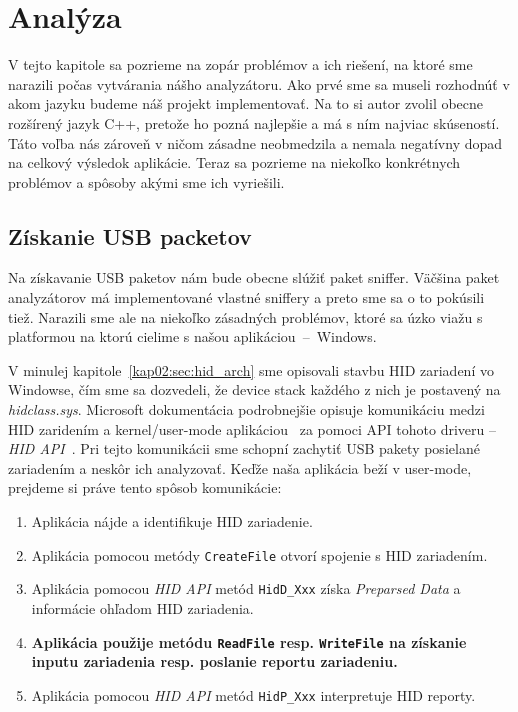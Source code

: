 \chapter{Analýza}
V tejto kapitole sa pozrieme na zopár problémov a ich riešení, na ktoré sme narazili počas vytvárania nášho analyzátoru.
Ako prvé sme sa museli rozhodnúť v akom jazyku budeme náš projekt implementovať. Na to si autor zvolil obecne rozšírený jazyk C++, pretože ho pozná najlepšie a má s ním najviac skúseností. Táto voľba nás zároveň v ničom zásadne neobmedzila a nemala negatívny dopad na celkový výsledok aplikácie. Teraz sa pozrieme na niekoľko konkrétnych problémov a spôsoby akými sme ich vyriešili.

\section{Získanie USB packetov}
Na získavanie USB paketov nám bude obecne slúžiť paket sniffer. Väčšina paket analyzátorov má implementované vlastné sniffery a preto sme sa o to pokúsili tiež. Narazili sme ale na niekoľko zásadných problémov, ktoré sa úzko viažu s platformou na ktorú cielime s našou aplikáciou~--~Windows.

V minulej kapitole~\ref{kap02:sec:hid_arch} sme opisovali stavbu HID zariadení vo Windowse, čím sme sa dozvedeli, že device stack každého z nich je postavený na \textit{hidclass.sys}. Microsoft dokumentácia podrobnejšie opisuje komunikáciu medzi HID zaridením a kernel/user-mode aplikáciou~\cite{hid_opening_collections} za pomoci API tohoto driveru -- \textit{HID API}~\cite{hid_api}.
Pri tejto komunikácii sme schopní zachytiť USB pakety posielané zariadením a neskôr ich analyzovať. Keďže naša aplikácia beží v user-mode, prejdeme si práve tento spôsob komunikácie:
\begin{enumerate}
\item Aplikácia nájde a identifikuje HID zariadenie.
\item Aplikácia pomocou metódy \texttt{CreateFile} otvorí spojenie s HID zariadením.
\item Aplikácia pomocou \textit{HID API} metód \texttt{HidD\_Xxx} získa \textit{Preparsed Data} a informácie ohľadom HID zariadenia.
\item \label{kap03:read:paket} \textbf{Aplikácia použije metódu \texttt{ReadFile} resp. \texttt{WriteFile} na získanie inputu zariadenia resp. poslanie reportu zariadeniu.}
\item Aplikácia pomocou \textit{HID API} metód \texttt{HidP\_Xxx} interpretuje HID reporty.
\end{enumerate}

